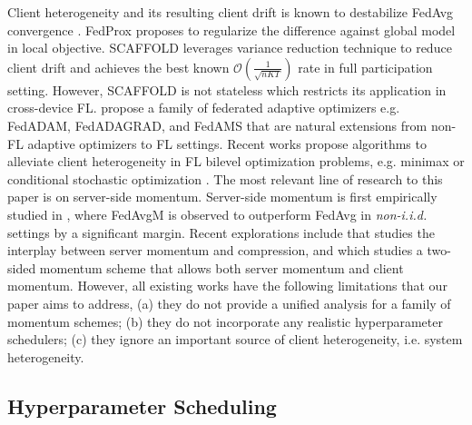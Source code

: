 Client heterogeneity and its resulting client drift is known to destabilize FedAvg convergence \citep{zhao2018federated-noniid,karimireddy2020scaffold}. FedProx \citep{Li20FedProx} proposes to regularize the difference against global model in local objective. SCAFFOLD \citep{karimireddy2020scaffold} leverages variance reduction technique to reduce client drift and achieves the best known $\mathcal{O}\left(\frac{1}{\sqrt{nKT}}\right)$ rate in full participation setting. However, SCAFFOLD is not stateless which restricts its application in cross-device FL. \cite{reddi2020adaptive,wang22adaptive} propose a family of federated adaptive optimizers e.g. FedADAM, FedADAGRAD, and FedAMS that are natural extensions from non-FL adaptive optimizers to FL settings. Recent works propose algorithms to alleviate client heterogeneity in FL bilevel optimization problems, e.g. minimax \cite{wu2023solving} or conditional stochastic optimization \cite{wu2023federated}. The most relevant line of research to this paper is on server-side momentum. Server-side momentum is first empirically studied in \citep{Hsu2019MeasuringTE}, where FedAvgM is observed to outperform FedAvg in \textit{non-i.i.d.} settings by a significant margin. Recent explorations include \citep{rothchild20fetchsgd} that studies the interplay between server momentum and compression, and \citep{khanduri2021stem} which studies a two-sided momentum scheme that allows both server momentum and client momentum. However, all existing works have the following limitations that our paper aims to address, (a) they do not provide a unified analysis for a family of momentum schemes; (b) they do not incorporate any realistic hyperparameter schedulers; (c) they ignore an important source of client heterogeneity, i.e. system heterogeneity.


\subsection{Hyperparameter Scheduling}
\label{subsec:multistage_related_work}


